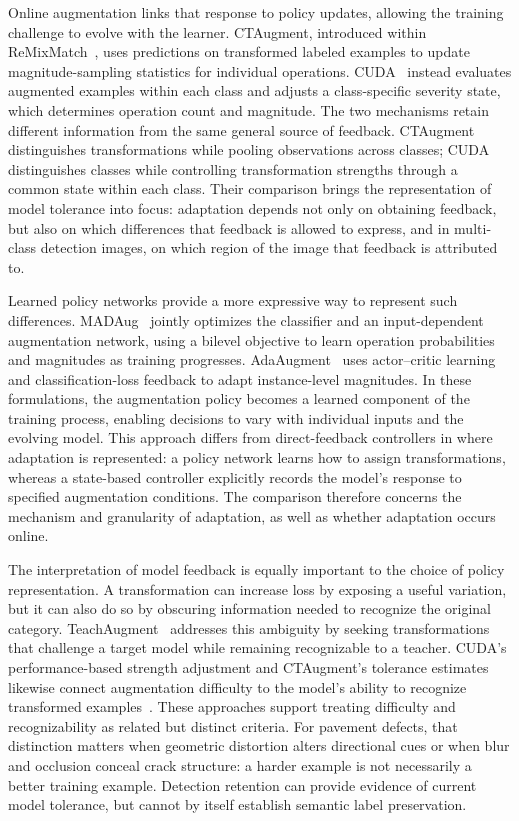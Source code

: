 \documentclass[conference]{IEEEtran}
\begin{document}
Online augmentation links that response to policy updates, allowing the training challenge to evolve with the learner. CTAugment, introduced within ReMixMatch~\cite{berthelot2020}, uses predictions on transformed labeled examples to update magnitude-sampling statistics for individual operations. CUDA~\cite{ahn2023cuda} instead evaluates augmented examples within each class and adjusts a class-specific severity state, which determines operation count and magnitude. The two mechanisms retain different information from the same general source of feedback. CTAugment distinguishes transformations while pooling observations across classes; CUDA distinguishes classes while controlling transformation strengths through a common state within each class. Their comparison brings the representation of model tolerance into focus: adaptation depends not only on obtaining feedback, but also on which differences that feedback is allowed to express, and in multi-class detection images, on which region of the image that feedback is attributed to.

Learned policy networks provide a more expressive way to represent such differences. MADAug~\cite{hou2023madaug} jointly optimizes the classifier and an input-dependent augmentation network, using a bilevel objective to learn operation probabilities and magnitudes as training progresses. AdaAugment~\cite{yang2025adaaugment} uses actor--critic learning and classification-loss feedback to adapt instance-level magnitudes. In these formulations, the augmentation policy becomes a learned component of the training process, enabling decisions to vary with individual inputs and the evolving model. This approach differs from direct-feedback controllers in where adaptation is represented: a policy network learns how to assign transformations, whereas a state-based controller explicitly records the model's response to specified augmentation conditions. The comparison therefore concerns the mechanism and granularity of adaptation, as well as whether adaptation occurs online.

The interpretation of model feedback is equally important to the choice of policy representation. A transformation can increase loss by exposing a useful variation, but it can also do so by obscuring information needed to recognize the original category. TeachAugment~\cite{suzuki2022teach} addresses this ambiguity by seeking transformations that challenge a target model while remaining recognizable to a teacher. CUDA's performance-based strength adjustment and CTAugment's tolerance estimates likewise connect augmentation difficulty to the model's ability to recognize transformed examples~\cite{ahn2023cuda,berthelot2020}. These approaches support treating difficulty and recognizability as related but distinct criteria. For pavement defects, that distinction matters when geometric distortion alters directional cues or when blur and occlusion conceal crack structure: a harder example is not necessarily a better training example. Detection retention can provide evidence of current model tolerance, but cannot by itself establish semantic label preservation.
\end{document}
